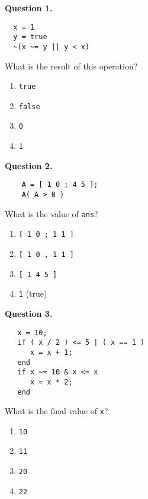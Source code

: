 \documentclass[12pt]{article}
\begin{document}
\bigskip

\bigskip


{\bf Question 1.}     

  \begin{Verbatim}
  x = 1
  y = true
  ~(x ~= y || y < x)
  \end{Verbatim}
  
  What is the result of this operation?
  
  \begin{enumerate}[label=\Alph*]
  	\item  \texttt{true}
  	\item  \texttt{false}
  	\item  \texttt{0}
  	\item  \texttt{1}
  \end{enumerate}



{\bf Question 2.} 
    \begin{Verbatim}
    A = [ 1 0 ; 4 5 ];
    A( A > 0 )
    \end{Verbatim}
    
    What is the value of \texttt{ans}?
    
    \begin{enumerate}[label=\Alph*]
    	\item  \texttt{[ 1 0 ; 1 1 ]}
    	\item  \texttt{[ 1 0 , 1 1 ]}
    	\item  \texttt{[ 1 4 5 ]}
    	\item  \texttt{1}  (true)
    \end{enumerate}

{\bf Question 3.} 
   \begin{Verbatim}
   x = 10;
   if ( x / 2 ) <= 5 | ( x == 1 )
      x = x + 1;
   end
   if x ~= 10 & x <= x
      x = x * 2;
   end
   \end{Verbatim}
   
   What is the final value of \texttt{x}?
   
   \begin{enumerate}[label=\Alph*]
   	\item  \texttt{10}
   	\item  \texttt{11}
   	\item  \texttt{20}
   	\item  \texttt{22}
   \end{enumerate}
\end{document}
